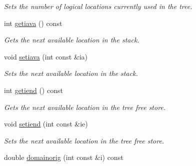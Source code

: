 \begin{DoxyCompactItemize}
\begin{DoxyCompactList}\small\item\em Sets the number of logical locations currently used in the tree. \item\end{DoxyCompactList}\item 
\hypertarget{classTree__Header_a004054503f011bbbdaae66160533eec0}{
int \hyperlink{classTree__Header_a004054503f011bbbdaae66160533eec0}{getiava} () const }
\label{classTree__Header_a004054503f011bbbdaae66160533eec0}

\begin{DoxyCompactList}\small\item\em Gets the next available location in the stack. \item\end{DoxyCompactList}\item 
\hypertarget{classTree__Header_a60dc5cf68125321d1430caa41a7c81eb}{
void \hyperlink{classTree__Header_a60dc5cf68125321d1430caa41a7c81eb}{setiava} (int const \&ia)}
\label{classTree__Header_a60dc5cf68125321d1430caa41a7c81eb}

\begin{DoxyCompactList}\small\item\em Sets the next available location in the stack. \item\end{DoxyCompactList}\item 
\hypertarget{classTree__Header_a37fc3f03126c6df299bef979d1683d4a}{
int \hyperlink{classTree__Header_a37fc3f03126c6df299bef979d1683d4a}{getiend} () const }
\label{classTree__Header_a37fc3f03126c6df299bef979d1683d4a}

\begin{DoxyCompactList}\small\item\em Gets the next available location in the tree free store. \item\end{DoxyCompactList}\item 
\hypertarget{classTree__Header_a915e46ea6d11fad48babb4364cb3af9b}{
void \hyperlink{classTree__Header_a915e46ea6d11fad48babb4364cb3af9b}{setiend} (int const \&ie)}
\label{classTree__Header_a915e46ea6d11fad48babb4364cb3af9b}

\begin{DoxyCompactList}\small\item\em Sets the next available location in the tree free store. \item\end{DoxyCompactList}\item 
\hypertarget{classTree__Header_af9ca5ec4f523ecb763b794981d81ea3d}{
double \hyperlink{classTree__Header_af9ca5ec4f523ecb763b794981d81ea3d}{domainorig} (int const \&i) const }
\label{classTree__Header_af9ca5ec4f523ecb763b794981d81ea3d}


\end{DoxyCompactItemize}
